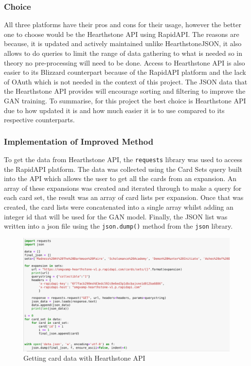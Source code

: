 \documentclass{report} %
\begin{document}
\subsubsection{Choice}
All three platforms have their pros and cons for their usage, however the better one to choose would be the Hearthstone API using RapidAPI. The reasons are because, it is updated and actively maintained unlike HearthstoneJSON, it also allows to do queries to limit the range of data gathering to what is needed so in theory no pre-processing will need to be done. Access to Hearthstone API is also easier to its Blizzard counterpart because of the RapidAPI platform and the lack of OAuth which is not needed in the context of this project. The JSON data that the Hearthstone API provides will encourage sorting and filtering to improve the GAN training. To summarise, for this project the best choice is Hearthstone API due to how updated it is and how much easier it is to use compared to its respective counterparts. 
\subsubsection{Implementation of Improved Method}
To get the data from Hearthstone API, the \nolinkurl{requests} library was used to access the RapidAPI platform. The data was collected using the Card Sets query built into the API which allows the user to get all the cards from an expansion. An array of these expansions was created and iterated through to make a query for each card set, the result was an array of card lists per expansion. Once that was created, the card lists were concatenated into a single array whilst adding an integer id that will be used for the GAN model. Finally, the JSON list was written into a json file using the \nolinkurl{json.dump()} method from the \nolinkurl{json} library.

\begin{figure}[h]
\centering
\includegraphics[width=1.25\textwidth]{cardAPI}
\caption{Getting card data with Hearthstone API\protect}
 \label{board}
\end{figure}
\end{document}
